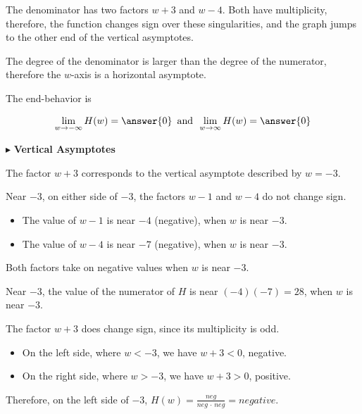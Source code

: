\documentclass{ximera}
\begin{document}
\begin{example}
The denominator has two factors $w+3$ and $w-4$.  Both have   multiplicity, therefore, the function changes sign over these singularities, and the graph jumps to the other end of the vertical asymptotes.


The degree of the denominator is larger than the degree of the numerator, therefore the $w$-axis is a horizontal asymptote.



The end-behavior is



\[       \lim_{w \to -\infty} H(w) = \answer{0}   \, \text{ and } \,    \lim_{w \to \infty} H(w) = \answer{0}               \]





$\blacktriangleright$ \textbf{Vertical Asymptotes} 





The factor $w+3$ corresponds to the vertical asymptote described by $w = -3$.


Near $-3$, on either side of $-3$, the factors $w-1$ and $w-4$ do not change sign. 



\begin{itemize}
\item The value of $w-1$ is near $-4$ (negative), when $w$ is near $-3$.
\item The value of $w-4$ is near $-7$ (negative), when $w$ is near $-3$.
\end{itemize}

Both factors take on negative values when $w$ is near $-3$.  

Near $-3$, the value of the numerator of $H$ is near $(-4)(-7) = 28$, when $w$ is near $-3$.  





The factor $w+3$ does change sign, since its multiplicity is odd.

\begin{itemize}
\item On the left side, where $w < -3$, we have $w+3<0$, negative.
\item On the right side, where $w > -3$, we have $w+3>0$, positive.
\end{itemize}


Therefore, on the left side of $-3$, $H(w) = \frac{neg}{neg \, \cdot \, neg} = negative$.  


\end{example}
\end{document}
